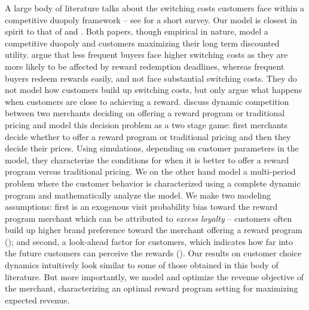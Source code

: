A large body of literature talks about the switching costs customers face within a competitive duopoly framework -- see \cite{villas2015short} for a short survey.
Our model is closest in spirit to that of \cite{hartmann2008frequency} and \cite{kopalle2001economic}.
Both papers, though empirical in nature, model a competitive duopoly and customers maximizing their long term discounted utility.
\cite{hartmann2008frequency} argue that less frequent buyers face higher switching costs as they are more likely to be affected by reward redemption deadlines, whereas frequent buyers redeem rewards easily, and not face substantial switching costs. 
They do not model how customers build up switching costs, but only argue what happens when customers are close to achieving a reward.
\cite{kopalle2001economic} discuss dynamic competition between two merchants deciding on offering a reward program or traditional pricing and model this decision problem as a two stage game: first merchants decide whether to offer a reward program or traditional pricing and then they decide their prices. 
Using simulations, depending on customer parameters in the model, they characterize the conditions for when it is better to offer a reward program versus traditional pricing.
We on the other hand model a multi-period problem where the customer behavior is characterized using a complete dynamic program and mathematically analyze the model.
We make two modeling assumptions: first is an exogenous visit probability bias toward the reward program merchant which can be attributed to \emph{excess loyalty} -- customers often build up higher brand preference toward the merchant offering a reward program (\cite{fader1993excess, sharp1997loyalty}); 
and second, a look-ahead factor for customers, which indicates how far into the future customers can perceive the rewards (\cite{liu2007long,lewis2004influence}).
Our results on customer choice dynamics intuitively look similar to some of those obtained in this body of literature.
But more importantly, we model and optimize the revenue objective of the merchant, characterizing an optimal reward program setting for maximizing expected revenue.
